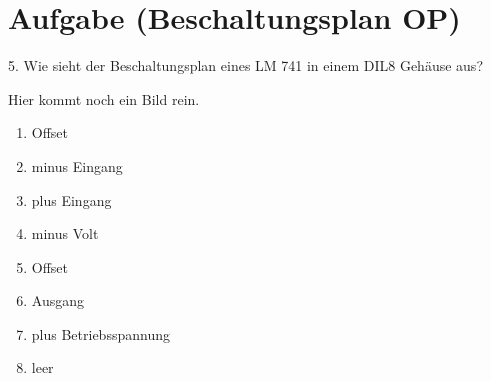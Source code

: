 \section{Aufgabe (Beschaltungsplan OP)}%
\label{sec:aufgabe_5}

5. Wie sieht der Beschaltungsplan eines LM 741 in einem DIL8 Gehäuse aus?


Hier kommt noch ein Bild rein.

\begin{enumerate}
    \item Offset
        \item minus Eingang
            \item plus Eingang
                \item minus Volt
                    \item Offset
                        \item Ausgang
                            \item plus Betriebsspannung
                                \item leer
\end{enumerate}
